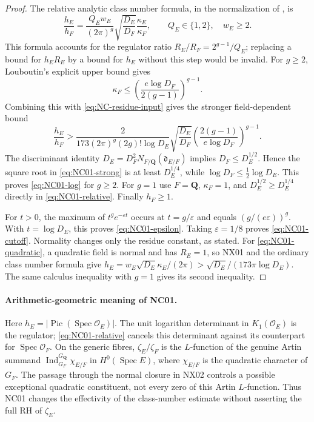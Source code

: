 \documentclass[11pt]{article}
\theoremstyle{remark}
\begin{document}
\begin{proof}
The relative analytic class number formula, in the normalization of
\cite[\S3, equation (21), p.~1200]{NC-Louboutin2001}, is
\begin{equation}\label{eq:NC01-relative}
 \frac{h_E}{h_F}=
 \frac{Q_Ew_E}{(2\pi)^g}
 \sqrt{\frac{D_E}{D_F}}\frac{\kappa_E}{\kappa_F},
 \qquad Q_E\in\{1,2\},\quad w_E\geq2.
\end{equation}
This formula accounts for the regulator ratio
$R_E/R_F=2^{g-1}/Q_E$; replacing a bound for $h_ER_E$ by a bound for
$h_E$ without this step would be invalid.
For $g\geq2$, Louboutin's explicit upper bound
\cite[Theorem~1(1), p.~1195]{NC-Louboutin2001} gives
\[
 \kappa_F\leq
 \left(\frac{e\log D_F}{2(g-1)}\right)^{g-1}.
\]
Combining this with \eqref{eq:NC-residue-input} gives the stronger
field-dependent bound
\begin{equation}\label{eq:NC01-strong}
 \frac{h_E}{h_F}>
 \frac{2}{173(2\pi)^g(2g)!\log D_E}
 \sqrt{\frac{D_E}{D_F}}
 \left(\frac{2(g-1)}{e\log D_F}\right)^{g-1}.
\end{equation}
The discriminant identity
$D_E=D_F^2N_{F/\mathbf Q}(\mathfrak d_{E/F})$ implies
$D_F\leq D_E^{1/2}$.  Hence the square root in
\eqref{eq:NC01-strong} is at least $D_E^{1/4}$, while
$\log D_F\leq\tfrac12\log D_E$.  This proves
\eqref{eq:NC01-log} for $g\geq2$.  For $g=1$ use
$F=\mathbf Q$, $\kappa_F=1$, and
$D_E^{1/2}\geq D_E^{1/4}$ directly in
\eqref{eq:NC01-relative}.  Finally $h_F\geq1$.

For $t>0$, the maximum of $t^g e^{-\varepsilon t}$ occurs at
$t=g/\varepsilon$ and equals $(g/(e\varepsilon))^g$.
With $t=\log D_E$, this proves \eqref{eq:NC01-epsilon}.
Taking $\varepsilon=1/8$ proves \eqref{eq:NC01-cutoff}.
Normality changes only the residue constant, as stated.
For \eqref{eq:NC01-quadratic}, a quadratic field is normal and has
$R_E=1$, so NX01 and the ordinary class number formula give
$h_E=w_E\sqrt{D_E}\kappa_E/(2\pi)>
\sqrt{D_E}/(173\pi\log D_E)$.
The same calculus inequality with $g=1$ gives its second inequality.
\end{proof}

\paragraph{Arithmetic-geometric meaning of NC01.}
Here $h_E=|\operatorname{Pic}(\operatorname{Spec}\mathcal O_E)|$.
The unit logarithm determinant in $K_1(\mathcal O_E)$ is the regulator;
\eqref{eq:NC01-relative} cancels this determinant against its counterpart
for $\operatorname{Spec}\mathcal O_F$.  On the generic fibres,
$\zeta_E/\zeta_F$ is the $L$-function of the genuine Artin summand
$\operatorname{Ind}_{G_F}^{G_{\mathbf Q}}\chi_{E/F}$ in
$H^0(\operatorname{Spec}E)$, where $\chi_{E/F}$ is the quadratic
character of $G_F$.  The passage through the normal closure in NX02
controls a possible exceptional quadratic constituent, not every zero
of this Artin $L$-function.  Thus NC01 changes the effectivity of the
class-number estimate without asserting the full RH of $\zeta_E$.
\end{document}
